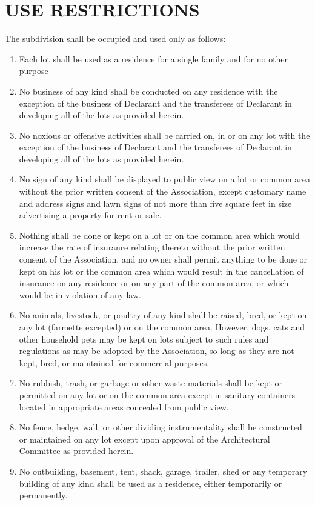 \documentclass[12pt, letterpaper]{article}
\begin{document}
\section{USE RESTRICTIONS}
The subdivision shall be occupied and used only as follows:
\begin{enumerate}
\item Each lot shall be used as a residence for a single family and for no other purpose
\item No business of any kind shall be conducted on any residence with the exception of the business of Declarant and the transferees of Declarant in developing all of the lots as provided herein.
\item No noxious or offensive activities shall be carried on, in or on any lot with the exception of the business of Declarant and the transferees of Declarant in developing all of the lots as provided herein.
\item No sign of any kind shall be displayed to public view on a lot or common area without the prior written consent of the Association, except customary name and address signs and lawn signs of not more than five square feet in size advertising a property for rent or sale.
\item Nothing shall be done or kept on a lot or on the common area which would increase the rate of insurance relating thereto without the prior written consent of the Association, and no owner shall permit anything to be done or kept on his lot or the common area which would result in the cancellation of insurance on any residence or on any part of the common area, or which would be in violation of any law.
\item No animals, livestock, or poultry of any kind shall be raised, bred, or kept on any lot (farmette excepted) or on the common area.
However, dogs, cats and other household pets may be kept on lots subject to such rules and regulations as may be adopted by the Association, so long as they are not kept, bred, or maintained for commercial purposes.
\item No rubbish, trash, or garbage or other waste materials shall be kept or permitted on any lot or on the common area except in sanitary containers located in appropriate areas concealed from public view.
\item No fence, hedge, wall, or other dividing instrumentality shall be constructed or maintained on any lot except upon approval of the Architectural Committee as provided herein.
\item No outbuilding, basement, tent, shack, garage, trailer, shed or any temporary building of any kind shall be used as a residence, either temporarily or permanently.

\end{enumerate}
\end{document}
